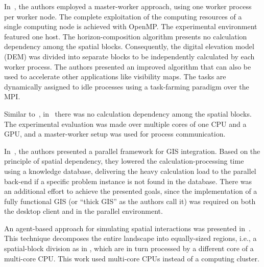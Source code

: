 In~\cite{Tabik-High_performance_three_horizon_composition_algorithm_for_large_scale_terrains:2011},
the authors employed a master-worker approach, using one worker process
per worker node. The complete exploitation of the computing resources
of a single computing node is achieved with OpenMP. The experimental
environment featured one host. The horizon-composition algorithm presents
no calculation dependency among the spatial blocks. Consequently,
the digital elevation model (DEM) was divided into separate blocks
to be independently calculated by each worker process. The authors
presented an improved algorithm that can also be used to accelerate
other applications like visibility maps. The tasks are dynamically
assigned to idle processes using a task-farming paradigm over the
MPI. 

Similar to~\cite{Tabik-High_performance_three_horizon_composition_algorithm_for_large_scale_terrains:2011},
in~\cite{Tabik-Optimal_tilt_and_orientation_maps_a_multi_algorithm_approach_for_heterogeneous_multicore_GPU_systems:2013}
there was no calculation dependency among the spatial blocks. The
experimental evaluation was made over multiple cores of one CPU and
a GPU, and a master-worker setup was used for process communication.

In~\cite{Yin_A_framework_for_integrating_GIS_and_parallel_computing_for_spatial_control_problems_a_case_study_of_wildfire_dontrol:2012},
the authors presented a parallel framework for GIS integration. Based
on the principle of spatial dependency, they lowered the calculation-processing
time using a knowledge database, delivering the heavy calculation
load to the parallel back-end if a specific problem instance is not
found in the database. There was an additional effort to achieve the
presented goals, since the implementation of a fully functional GIS
(or ``thick GIS'' as the authors call it) was required on both the
desktop client and in the parallel environment.

An agent-based approach for simulating spatial interactions was presented
in~\cite{Gong_Parallel_agent_based_simulation_of_individual_level_spatial_interactions_within_a_multicore_computing_environment:2012}.
This technique decomposes the entire landscape into equally-sized
regions, i.e., a spatial-block division as in \cite{Tabik-High_performance_three_horizon_composition_algorithm_for_large_scale_terrains:2011},
which are in turn processed by a different core of a multi-core CPU.
This work used multi-core CPUs instead of a computing cluster.


